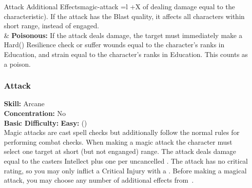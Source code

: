 \begin{table*}[!htb]
\begin{GenesysTable}{Attack Additional Effects}{magic-attack}{ =l +X}
                            of dealing damage equal to the characteristic). If the attack has the  Blast quality, it affects
                            all characters within short range, instead of engaged.\\
\difficulty\difficulty  & \textbf{Poisonous:} If the attack deals damage, the target must immediately make a
                            Hard(\difficulty\difficulty\difficulty) Resilience check or suffer wounds equal to the character's
                            ranks in Education, and strain equal to the character's ranks in Education. This counts as a poison.\\
\end{GenesysTable}
\end{table*}

\subsubsection{Attack}
\textbf{Skill:} Arcane\\
\textbf{Concentration:} No\\
\textbf{Basic Difficulty:} \textbf{Easy:} (\difficulty)\\
Magic attacks are cast spell checks but additionally follow the normal rules for
performing combat checks. When making a magic attack the character must select
one target at short (but not enganged) range. The attack deals damage equal to
the casters Intellect plus one per uncancelled \success. The attack has no
critical rating, so you may only inflict a Critical Injury with a \triumph.
Before making a magical attack, you may choose any number of additional effects
from~.

